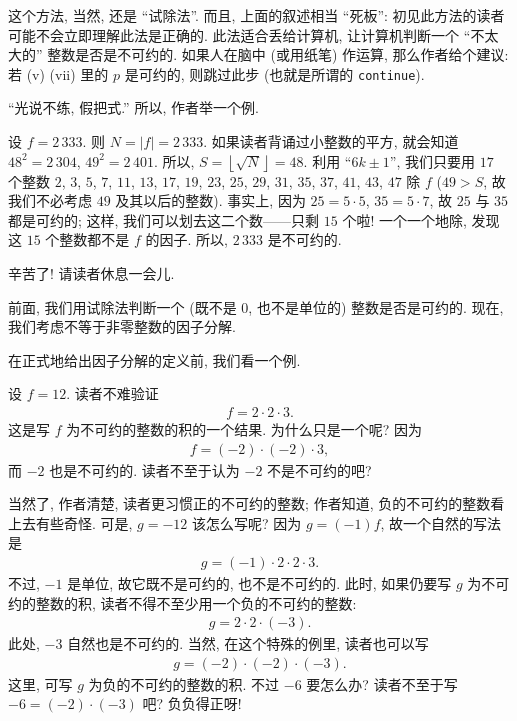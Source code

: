 这个方法, 当然, 还是 ``试除法''. 而且, 上面的叙述相当 ``死板'': 初见此方法的读者可能不会立即理解此法是正确的. 此法适合丢给计算机, 让计算机判断一个 ``不太大的'' 整数是否是不可约的. 如果人在脑中 (或用纸笔) 作运算, 那么作者给个建议: 若 (v) (vii) 里的 $p$ 是可约的, 则跳过此步 (也就是所谓的 \texttt{continue}).

``光说不练, 假把式.'' 所以, 作者举一个例.

\begin{example}
    设 $f = 2\,333$. 则 $N = |f| = 2\,333$. 如果读者背诵过小整数的平方, 就会知道 $48^2 = 2\,304$, $49^2 = 2\,401$. 所以, $S = \left \lfloor \sqrt{N} \right \rfloor = 48$. 利用 ``$6k \pm 1$'', 我们只要用 $17$ 个整数 $2$, $3$, $5$, $7$, $11$, $13$, $17$, $19$, $23$, $25$, $29$, $31$, $35$, $37$, $41$, $43$, $47$ 除 $f$ ($49 > S$, 故我们不必考虑 $49$ 及其以后的整数). 事实上, 因为 $25 = 5 \cdot 5$, $35 = 5 \cdot 7$, 故 $25$ 与 $35$ 都是可约的; 这样, 我们可以划去这二个数——只剩 $15$ 个啦! 一个一个地除, 发现这 $15$ 个整数都不是 $f$ 的因子. 所以, $2\,333$ 是不可约的.
\end{example}

辛苦了! 请读者休息一会{\scriptsize 儿}.

\myLine

前面, 我们用试除法判断一个 (既不是 $0$, 也不是单位的) 整数是否是可约的. 现在, 我们考虑不等于非零整数的因子分解.

在正式地给出因子分解的定义前, 我们看一个例.

\begin{example}
    设 $f = 12$. 读者不难验证
    \begin{align*}
        f = 2 \cdot 2 \cdot 3.
    \end{align*}
    这是写 $f$ 为不可约的整数的积的一个结果. 为什么只是一个呢? 因为
    \begin{align*}
        f = (-2) \cdot (-2) \cdot 3,
    \end{align*}
    而 $-2$ 也是不可约的. 读者不至于认为 $-2$ 不是不可约的吧?

    当然了, 作者清楚, 读者更习惯正的不可约的整数; 作者知道, 负的不可约的整数看上去有些奇怪. 可是, $g = -12$ 该怎么写呢? 因为 $g = (-1)f$, 故一个自然的写法是
    \begin{align*}
        g = (-1) \cdot 2 \cdot 2 \cdot 3.
    \end{align*}
    不过, $-1$ 是单位, 故它既不是可约的, 也不是不可约的. 此时, 如果仍要写 $g$ 为不可约的整数的积, 读者不得不至少用一个负的不可约的整数:
    \begin{align*}
        g = 2 \cdot 2 \cdot (-3).
    \end{align*}
    此处, $-3$ 自然也是不可约的. 当然, 在这个特殊的例里, 读者也可以写
    \begin{align*}
        g = (-2) \cdot (-2) \cdot (-3).
    \end{align*}
    这里, 可写 $g$ 为负的不可约的整数的积. 不过 $-6$ 要怎么办? 读者不至于写 $-6 = (-2) \cdot (-3)$ 吧? 负负得正呀!
\end{example}

